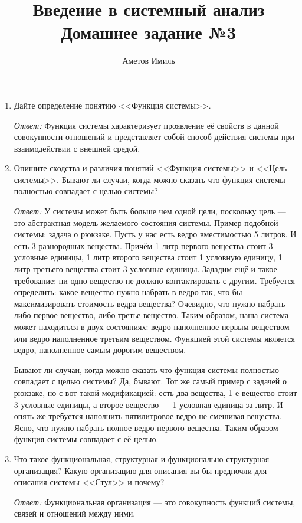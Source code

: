 \documentclass[10pt]{article}
\author{Аметов Имиль}
\title{Введение в системный анализ \\ Домашнее задание №3}
\begin{document}
\maketitle

\begin{enumerate}
\item{Дайте определение понятию <<Функция системы>>.}

  \emph{Ответ:} Функция системы характеризует проявление её свойств в данной совокупности отношений и представляет собой способ действия системы при взаимодействии с внешней средой.
  
\item{Опишите сходства и различия понятий <<Функция системы>> и <<Цель системы>>. Бывают ли случаи, когда можно сказать что функция системы полностью совпадает с целью системы?}

  \emph{Ответ:} У системы может быть больше чем одной цели, поскольку цель --- это абстрактная модель желаемого состояния системы. Пример подобной системы: задача о рюкзаке. Пусть у нас есть ведро вместимостью 5 литров. И есть 3 разнородных вещества. Причём 1 литр первого вещества стоит 3 условные единицы, 1 литр второго вещества стоит 1 условную единицу, 1 литр третьего вещества стоит 3 условные единицы. Зададим ещё и такое требование: ни одно вещество не должно контактировать с другим. Требуется определить: какое вещество нужно набрать в ведро так, что бы максимизировать стоимость ведра вещества? Очевидно, что нужно набрать либо первое вещество, либо третье вещество. Таким образом, наша система может находиться в двух состояниях: ведро наполненное первым веществом или ведро наполненное третьим веществом.
  Функцией этой системы является ведро, наполненное самым дорогим веществом.

  Бывают ли случаи, когда можно сказать что функция системы полностью совпадает с целью системы? Да, бывают. Тот же самый пример с задачей о рюкзаке, но с вот такой модификацией: есть два вещества, 1-е вещество стоит 3 условные единицы, а второе вещество --- 1 условная единица за литр. И опять же требуется наполнить пятилитровое ведро не смешивая вещества. Ясно, что нужно набрать полное ведро первого вещества. Таким образом функция системы совпадает с её целью.

\item{Что такое функциональная, структурная и функционально-структурная организация? Какую организацию для описания вы бы предпочли для описания системы <<Стул>> и почему?}

  \emph{Ответ:} Функциональная организация --- это совокупность функций системы, связей и отношений между ними.


\end{enumerate}
\end{document}
